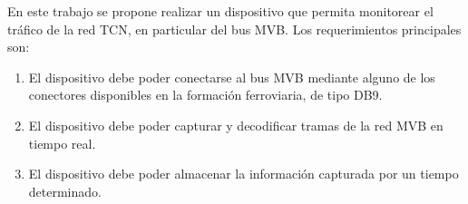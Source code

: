 En este trabajo se propone realizar un dispositivo que permita monitorear el tráfico de la red TCN, en particular del bus MVB. Los requerimientos principales son:

\begin{enumerate}
\item El dispositivo debe poder conectarse al bus MVB mediante alguno de los conectores disponibles en la formación ferroviaria, de tipo DB9.
\item El dispositivo debe poder capturar y decodificar tramas de la red MVB en tiempo real.
\item El dispositivo debe poder almacenar la información capturada por un tiempo determinado.
\end{enumerate}
